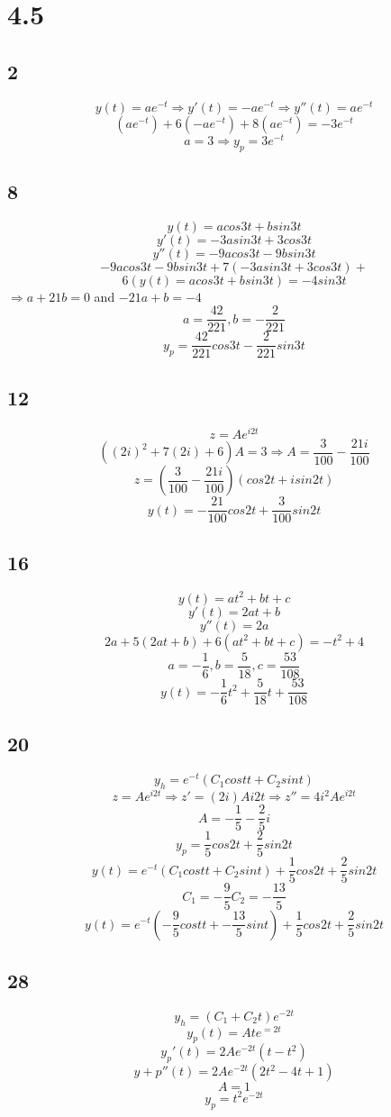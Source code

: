 \documentclass[12pt, a4paper]{IEEEtran}
\begin{document}
    \section*{4.5}
    \subsection*{2}
    $$y(t)=ae^{-t}\Rightarrow y'(t)=-ae^{-t} \Rightarrow y''(t)=ae^{-t}$$
    $$(ae^{-t})+6(-ae^{-t})+8(ae^{-t})=-3e^{-t}$$
    $$a=3\Rightarrow y_{p}=3e^{-t}$$    

    \subsection*{8}
    $$y(t)=acos3t+bsin3t$$
    $$y'(t)=-3asin3t+3cos3t$$
    $$y''(t)=-9acos3t-9bsin3t$$
    $$-9acos3t-9bsin3t+7(-3asin3t+3cos3t)+$$
    $$6(y(t)=acos3t+bsin3t)=-4sin3t$$
    $\Rightarrow a+21b=0$ and $-21a+b=-4$
    $$a=\frac{42}{221}, b=-\frac{2}{221}$$
    $$y_{p}=\frac{42}{221}cos3t-\frac{2}{221}sin3t$$

    \subsection*{12}
    $$z=Ae^{i2t}$$
    $$((2i)^2+7(2i)+6)A=3\Rightarrow A=\frac{3}{100}-\frac{21i}{100}$$
    $$z=(\frac{3}{100}-\frac{21i}{100})(cos2t+isin2t)$$
    $$y(t)=-\frac{21}{100}cos2t+\frac{3}{100}sin2t$$

    \subsection*{16}
    $$y(t)=at^2+bt+c$$
    $$y'(t)=2at+b$$
    $$y''(t)=2a$$
    $$2a+5(2at+b)+6(at^2+bt+c)=-t^2+4$$
    $$a=-\frac{1}{6},b=\frac{5}{18},c=\frac{53}{108}$$
    $$y(t)=-\frac{1}{6}t^2+\frac{5}{18}t+\frac{53}{108}$$

    \subsection*{20}
    $$y_h=e^{-t}(C_1costt+C_2sint)$$
    $$z=Ae^{i2t}\Rightarrow z'=(2i)Ai2t \Rightarrow z''=4i^2Ae^{i2t}$$
    $$A=-\frac{1}{5}-\frac{2}{5}i$$
    $$y_p=\frac{1}{5}cos2t+\frac{2}{5}sin2t$$
    $$y(t)=e^{-t}(C_1costt+C_2sint)+\frac{1}{5}cos2t+\frac{2}{5}sin2t$$
    $$C_1=-\frac{9}{5} C_2=-\frac{13}{5}$$
    $$y(t)=e^{-t}(-\frac{9}{5}costt+-\frac{13}{5}sint)+\frac{1}{5}cos2t+\frac{2}{5}sin2t$$

    \subsection*{28}
    $$y_h=(C_1+C_2t)e^{-2t}$$
    $$y_p(t)=Ate^{=2t}$$
    $$y_p'(t)=2Ae^{-2t}(t-t^2)$$
    $$y+p''(t)=2Ae^{-2t}(2t^2-4t+1)$$
    $$A=1$$
    $$y_p=t^2e^{-2t}$$
\end{document}
